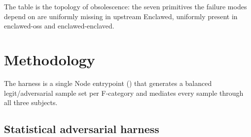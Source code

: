 \documentclass[11pt]{article}
\begin{document}
\begin{table}[h]
\centering
\footnotesize
\setlength{\tabcolsep}{4pt}
\caption{Empirical detection-primitive availability per subject. The probe
walked 14{,}419 upstream files and found zero matches for any of the seven
canonical symbols on Enclawed.}
\label{tab:primitive-presence}
\end{table}

\noindent The table is the topology of obsolescence: the seven primitives
the failure modes depend on are uniformly missing in upstream Enclawed,
uniformly present in enclawed-oss and enclawed-enclaved.

\section{Methodology}
\label{sec:methodology}

The harness is a single Node entrypoint
() that
generates a balanced legit/adversarial sample set per F-category and
mediates every sample through all three subjects.

\subsection{Statistical adversarial harness}
\end{document}

